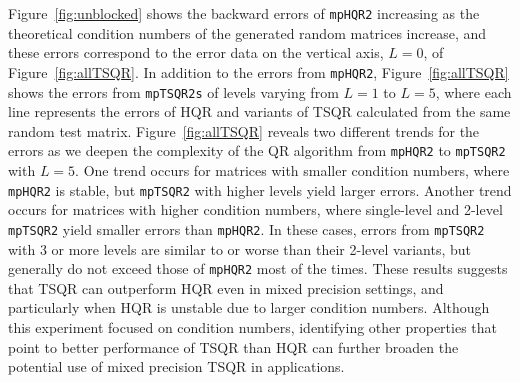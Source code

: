Figure~\ref{fig:unblocked} shows the backward errors of {\tt mpHQR2} increasing as the theoretical condition numbers of the generated random matrices increase, and these errors correspond to the error data on the vertical axis, $L=0$, of Figure~\ref{fig:allTSQR}.
In addition to the errors from {\tt mpHQR2}, Figure~\ref{fig:allTSQR} shows the errors from {\tt mpTSQR2s} of levels varying from $L=1$ to $L=5$, where each line represents the errors of HQR and variants of TSQR calculated from the same random test matrix.
Figure~\ref{fig:allTSQR} reveals two different trends for the errors as we deepen the complexity of the QR algorithm from {\tt mpHQR2} to {\tt mpTSQR2} with $L=5$. 
One trend occurs for matrices with smaller condition numbers, where {\tt mpHQR2} is stable, but {\tt mpTSQR2} with higher levels yield larger errors. 
Another trend occurs for matrices with higher condition numbers, where single-level and 2-level {\tt mpTSQR2} yield smaller errors than {\tt mpHQR2}. 
In these cases, errors from {\tt mpTSQR2} with 3 or more levels are similar to or worse than their 2-level variants, but generally do not exceed those of {\tt mpHQR2} most of the times.
These results suggests that TSQR can outperform HQR even in mixed precision settings, and particularly when HQR is unstable due to larger condition numbers.
Although this experiment focused on condition numbers, identifying other properties that point to better performance of TSQR than HQR can further broaden the potential use of mixed precision TSQR in applications.
%

